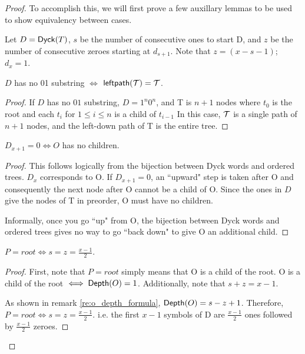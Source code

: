\begin{proof}
To accomplish this, we will first prove a few auxillary lemmas to be used to show equivalency between cases. 

Let $D=\mathsf{Dyck}{(T)}$, $s$ be the number of consecutive ones to start D, and $z$ be the number of consecutive zeroes starting at $d_{s+1}$.  Note that $z=(x-s-1)$; $d_{x}=1$.
\begin{lemma} \label{le:final_case_equivalence}

    $D$ has no 01 substring $\iff$ $\mathsf{leftpath}{(\mathcal{\mathcal{T}})}=\mathcal{T}$.
\end{lemma}
\begin{proof}


    If $D$ has no $01$ substring, $D=1^n0^n$, and T is $n+1$ nodes where $t_0$ is the root and each $t_i$ for $1\le i \le n$ is a child of $t_{i-1}$  In this case, $\mathcal{T}$ is a single path of $n+1$ nodes, and the left-down path of T is the entire tree.
\end{proof}
\begin{lemma} \label{le:no_children_equivalence}
    $D_{x+1} = 0 \iff O$ has no children.
\end{lemma}
\begin{proof}

    This follows logically from the bijection between Dyck words and ordered trees.  $D_x$ corresponds to O.  If $D_{x+1}=0$, an ``upward" step is taken after O and consequently the next node after O cannot be a child of O.  Since the ones in $D$ give the nodes of T in preorder, O must have no children.

    Informally, once you go ``up" from O, the bijection between Dyck words and ordered trees gives no way to go ``back down" to give O an additional child.
\end{proof}
\begin{lemma} \label{le:tight_case_equivalence}
    $P=root \iff s=z=\frac{x-1}{2}$.
\end{lemma}
\begin{proof}

    First, note that $P=root$ simply means that O is a child of the root.  O is a child of the root $\iff \mathsf{Depth}{(O)}=1$.  Additionally, note that $s+z=x-1$.

    As shown in remark \ref{re:o_depth_formula}, $\mathsf{Depth}{(O)}=s-z+1$. Therefore, $P=root \iff s=z=\frac{x-1}{2}$.
    i.e. the first $x-1$ symbols of D are $\frac{x-1}{2}$ ones followed by $\frac{x-1}{2}$ zeroes. 



\end{proof}
\end{proof}

